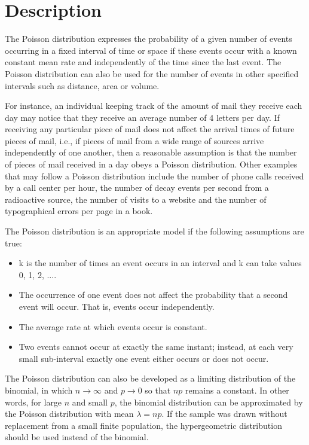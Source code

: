 \section{Description}
The Poisson distribution expresses the probability of a given number of events occurring in a fixed interval of time or space if these events occur with a known constant mean rate and independently of the time since the last event. The Poisson distribution can also be used for the number of events in other specified intervals such as distance, area or volume.

For instance, an individual keeping track of the amount of mail they receive each day may notice that they receive an average number of 4 letters per day. If receiving any particular piece of mail does not affect the arrival times of future pieces of mail, i.e., if pieces of mail from a wide range of sources arrive independently of one another, then a reasonable assumption is that the number of pieces of mail received in a day obeys a Poisson distribution. Other examples that may follow a Poisson distribution include the number of phone calls received by a call center per hour, the number of decay events per second from a radioactive source, the number of visits to a website and the number of typographical errors per page in a book.

The Poisson distribution is an appropriate model if the following assumptions are true:

\begin{itemize}
	\item k is the number of times an event occurs in an interval and k can take values 0, 1, 2, ....
	\item The occurrence of one event does not affect the probability that a second event will occur. That is, events occur independently.
	\item The average rate at which events occur is constant.
	\item Two events cannot occur at exactly the same instant; instead, at each very small sub-interval exactly one event either occurs or does not occur.
\end{itemize}

The Poisson distribution can also be developed as a limiting distribution of the binomial, in which $n \rightarrow \infty$ and $p \rightarrow 0$ so that $np$ remains a constant. In other words, for large $n$ and small $p$, the binomial distribution can be approximated by the Poisson distribution with mean $\lambda = np$.
If the sample was drawn without replacement from a small finite population, the hypergeometric distribution should be used instead of the binomial.

